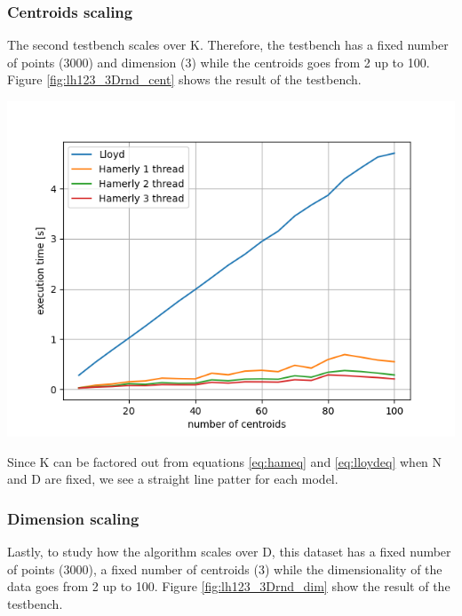 \documentclass{report}
\begin{document}
\begin{minipage}[b]{0.48\textwidth}


  \subsubsection*{Centroids scaling}
  The second testbench scales over K. Therefore, the testbench has a fixed number of points (3000) and dimension (3) while the centroids goes from 2 up to 100. Figure \ref{fig:lh123_3Drnd_cent} shows the result of the testbench.

  \begin{center} 
    \includegraphics[width = 1\textwidth]{imgs/lh123_3Drnd_cent.png}
    \label{fig:lh123_3Drnd_cent}
  \end{center}

  Since K can be factored out from equations \ref{eq:hameq} and \ref{eq:lloydeq} when N and D are fixed, we see a straight line patter for each model.
  
  \subsubsection*{Dimension scaling}
  Lastly, to study how the algorithm scales over D, this dataset has a fixed number of points (3000), a fixed number of centroids (3) while the dimensionality of the data goes from 2 up to 100. Figure \ref{fig:lh123_3Drnd_dim} show the result of the testbench.


\end{minipage}
\end{document}

